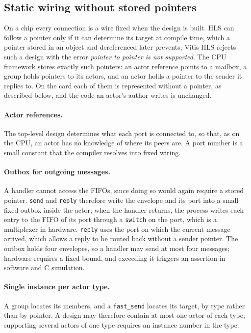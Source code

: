 \documentclass[11pt]{article}
\newcommand{\fs}{\texttt{fast\_send}}
\newcommand{\snd}{\texttt{send}}
\begin{document}
\subsection{Static wiring without stored pointers}
\label{sec:nopointers}

On a chip every connection is a wire fixed when the design is built. HLS can
follow a pointer only if it can determine its target at compile time, which a
pointer stored in an object and dereferenced later prevents; Vitis HLS rejects
such a design with the error \emph{pointer to pointer is not supported}. The CPU
framework stores exactly such pointers: an actor reference points to a mailbox,
a group holds pointers to its actors, and an actor holds a pointer to the sender
it replies to. On the card each of them is represented without a pointer, as
described below, and the code an actor's author writes is unchanged.

\paragraph{Actor references.} The top-level
design determines what each port is connected to, so that, as on the CPU, an
actor has no knowledge of where its peers are. A port number is a small
constant that the compiler resolves into fixed wiring.

\paragraph{Outbox for outgoing messages.} A handler cannot access the FIFOs, since
doing so would again require a stored pointer. \snd{} and \texttt{reply}
therefore write the envelope and its port into a small fixed outbox inside the
actor; when the handler returns, the process writes each entry to the FIFO of
its port through a \texttt{switch} on the port, which is a multiplexer in
hardware. \texttt{reply} uses the port on which the current message arrived,
which allows a reply to be routed back without a sender pointer. The outbox
holds four envelopes, so a handler may send at most four messages; hardware
requires a fixed bound, and exceeding it triggers an assertion in software and
C simulation.

\paragraph{Single instance per actor type.} A group
locates its members, and a \fs{} locates its target, by type rather than by
pointer. A design may therefore contain at most one actor of each type;
supporting several actors of one type requires an instance number in the
type.
\end{document}
